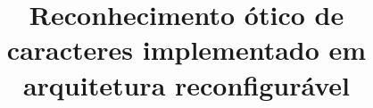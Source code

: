 \documentclass[tc]{dinfunisc-propostatc}
\title{Reconhecimento ótico de caracteres implementado em arquitetura reconfigurável}
\author{}{Fabiano Kist}
\begin{document}
\maketitle








%




\chapter{}
\makesignature
\end{document}
